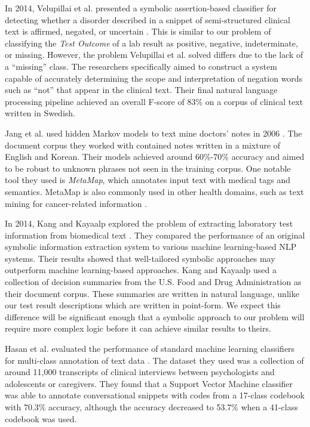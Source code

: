 \documentclass[sigconf]{acmart}
\begin{document}
In 2014, Velupillai et al. presented a symbolic assertion-based classifier for detecting whether a disorder described in a snippet of semi-structured clinical text is affirmed, negated, or uncertain \cite{velupillai2014cue}. This is similar to our problem of classifying the \textit{Test Outcome} of a lab result as positive, negative, indeterminate, or missing. However, the problem Velupillai et al. solved differs due to the lack of a ``missing'' class. The researchers specifically aimed to construct a system capable of accurately determining the scope and interpretation of negation words such as ``not'' that appear in the clinical text. Their final natural language processing pipeline achieved an overall F-score of 83\% on a corpus of clinical text written in Swedish.

Jang et al. used hidden Markov models to text mine doctors' notes in 2006 \cite{jang2006text}. The document corpus they worked with contained notes written in a mixture of English and Korean. Their models achieved around 60\%-70\% accuracy and aimed to be robust to unknown phrases not seen in the training corpus. One notable tool they used is \textit{MetaMap}, which annotates input text with medical tags and semantics. MetaMap is also commonly used in other health domains, such as text mining for cancer-related information \cite{spasic2014text}.

In 2014, Kang and Kayaalp explored the problem of extracting laboratory test information from biomedical text \cite{kang2013extracting}. They compared the performance of an original symbolic information extraction system to various machine learning-based NLP systems. Their results showed that well-tailored symbolic approaches may outperform machine learning-based approaches. Kang and Kayaalp used a collection of decision summaries from the U.S. Food and Drug Administration as their document corpus. These summaries are written in natural language, unlike our test result descriptions which are written in point-form. We expect this difference will be significant enough that a symbolic approach to our problem will require more complex logic before it can achieve similar results to theirs.

Hasan et al. evaluated the performance of standard machine learning classifiers for multi-class annotation of text data \cite{hasan2016study}. The dataset they used was a collection of around 11,000 transcripts of clinical interviews between psychologists and adolescents or caregivers. They found that a Support Vector Machine classifier was able to annotate conversational snippets with codes from a 17-class codebook with 70.3\% accuracy, although the accuracy decreased to 53.7\% when a 41-class codebook was used.
\end{document}
